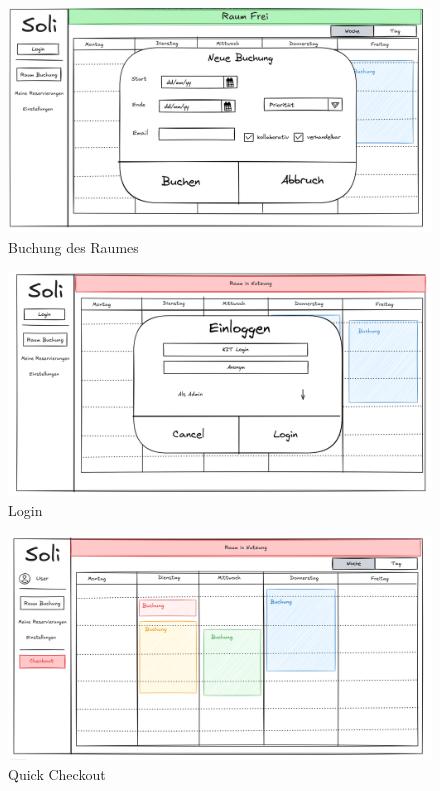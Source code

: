 \begin{figure}[ht]
    \centering
    \includegraphics[scale=0.15]{figures/booking.png}
    \caption{Buchung des Raumes}
    \label{fig:buchung}
\end{figure}

\begin{figure}[ht]
    \centering
    \includegraphics[scale=0.15]{figures/login.png}
    \caption{Login}
    \label{fig:login}
\end{figure}

\begin{figure}[ht]
    \centering
    \includegraphics[scale=0.15]{figures/checkout.png}
    \caption{Quick Checkout}
    \label{fig:checkout}
\end{figure}
\clearpage
